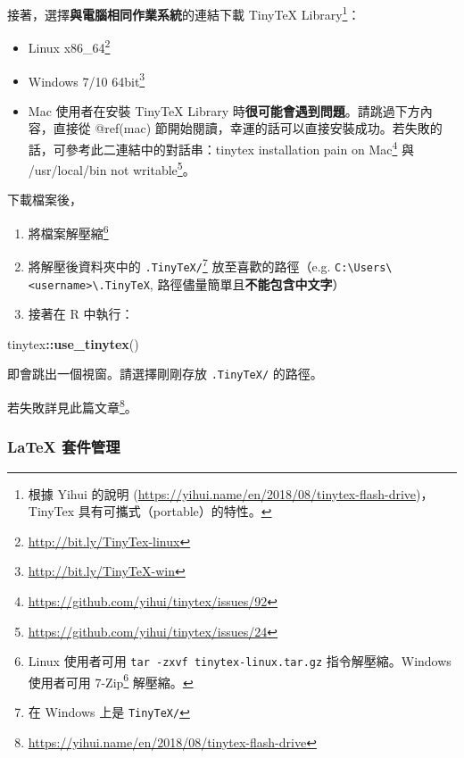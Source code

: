 \documentclass[oneside]{book}
\newenvironment{Shaded}{\begin{snugshade}}{\end{snugshade}}
\newcommand{\KeywordTok}[1]{\textcolor[rgb]{0.13,0.29,0.53}{\textbf{#1}}}
\newcommand{\NormalTok}[1]{#1}
\newcommand{\OperatorTok}[1]{\textcolor[rgb]{0.81,0.36,0.00}{\textbf{#1}}}
\renewcommand{\href}[2]{#2\footnote{\url{#1}}}
\providecommand{\tightlist}{%
  \setlength{\itemsep}{0pt}\setlength{\parskip}{0pt}}
\begin{document}
接著，選擇\textbf{與電腦相同作業系統}的連結下載 TinyTeX Library\footnote{根據 Yihui 的說明 (\url{https://yihui.name/en/2018/08/tinytex-flash-drive})，TinyTex 具有可攜式（portable）的特性。}：

\begin{itemize}
\tightlist
\item
  \href{http://bit.ly/TinyTex-linux}{Linux x86\_64}
\item
  \href{http://bit.ly/TinyTeX-win}{Windows 7/10 64bit}
\item
  Mac 使用者在安裝 TinyTeX Library 時\textbf{很可能會遇到問題}。請跳過下方內容，直接從 @ref(mac) 節開始閱讀，幸運的話可以直接安裝成功。若失敗的話，可參考此二連結中的對話串：\href{https://github.com/yihui/tinytex/issues/92}{tinytex installation pain on Mac} 與 \href{https://github.com/yihui/tinytex/issues/24}{/usr/local/bin not writable}。
\end{itemize}

下載檔案後，

\begin{enumerate}
\def\labelenumi{\alph{enumi})}
\item
  將檔案解壓縮\footnote{Linux 使用者可用 \texttt{tar\ -zxvf\ tinytex-linux.tar.gz} 指令解壓縮。Windows 使用者可用 \href{https://www.developershome.com/7-zip/}{7-Zip} 解壓縮。}
\item
  將解壓後資料夾中的 \texttt{.TinyTeX/}\footnote{在 Windows 上是 \texttt{TinyTeX/}} 放至喜歡的路徑（e.g. \texttt{C:\textbackslash{}Users\textbackslash{}\textless{}username\textgreater{}\textbackslash{}.TinyTeX}, 路徑儘量簡單且\textbf{不能包含中文字}）
\item
  接著在 R 中執行：
\end{enumerate}

\begin{Shaded}
\begin{Highlighting}[]
\NormalTok{tinytex}\OperatorTok{::}\KeywordTok{use_tinytex}\NormalTok{()}
\end{Highlighting}
\end{Shaded}

即會跳出一個視窗。請選擇剛剛存放 \texttt{.TinyTeX/} 的路徑。

若失敗詳見\href{https://yihui.name/en/2018/08/tinytex-flash-drive}{此篇文章}。

\hypertarget{tinytex-manage}{%
\subsubsection{LaTeX 套件管理}\label{tinytex-manage}}
\end{document}
